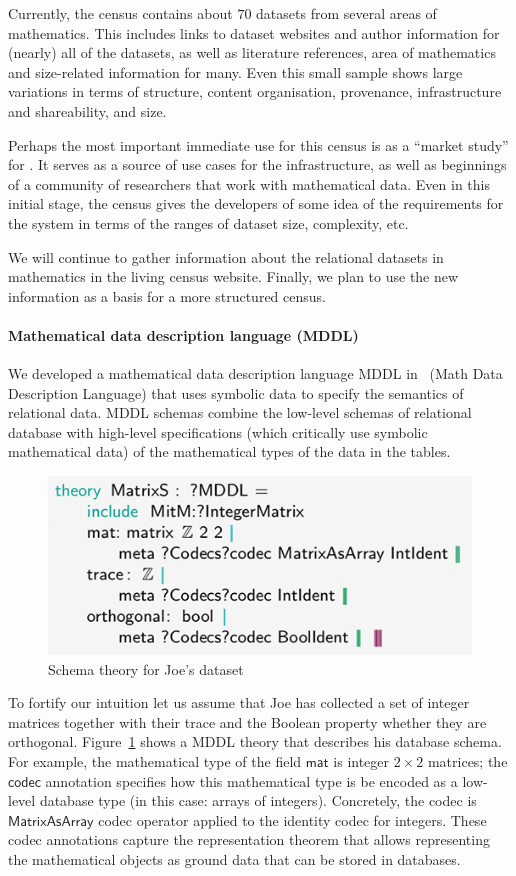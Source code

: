 Currently, the census contains about $70$ datasets from several areas of mathematics.
This includes links to dataset websites and author information for (nearly) all of the datasets,
as well as literature references, area of mathematics and size-related information for many.
Even this small sample shows large variations in terms of
structure, content organisation, provenance, infrastructure and shareability, and size.

Perhaps the most important immediate use for this census is as a 
``market study'' for \dmh.
It serves as a source of use cases for the infrastructure,
as well as beginnings of a community of researchers that work with mathematical data.
Even in this initial stage, the census gives the developers of \dmh
some idea of the requirements for the system in terms of the ranges of
dataset size, complexity, etc.

We will continue to gather information about the relational datasets 
in mathematics in the living census website.
Finally, we plan to use the new information as a basis for a more structured census.

\paragraph{Mathematical data description language (MDDL)}
We developed a mathematical data description language MDDL in~\cite{BerKohRab:tumdi19} (Math Data Description Language) that uses symbolic data to specify the semantics of relational data.
MDDL schemas combine the low-level schemas of relational database with high-level specifications
(which critically use symbolic mathematical data) of the mathematical types of the data in the tables.

\begin{figure}[ht]
  \includegraphics[width=.48\textwidth]{data_joe-schema}
  \caption{Schema theory for Joe's dataset}\label{fig:joe-schema}
\end{figure}

To fortify our intuition let us assume that Joe has collected a set of integer matrices together with their trace
and the Boolean property whether they are orthogonal.
Figure~\ref{fig:joe-schema} shows a MDDL theory that describes his database schema.
For example, the mathematical type of the field $\mathsf{mat}$ is integer $2\times2$ matrices;
the $\mathsf{codec}$ annotation specifies how this mathematical type is be encoded as a low-level database type (in this case: arrays of integers).
Concretely, the codec is $\mathsf{MatrixAsArray}$ codec operator applied to the identity codec for integers.
These codec annotations capture the representation theorem that allows representing the mathematical objects as ground data that can be stored in databases. 


